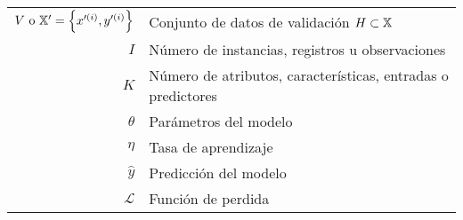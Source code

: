 \begin{table}[H]
\begin{center}
\begin{tabularx}{\textwidth}{|r|X|}
            ${V~\text{o}~\mathbb{{X}}^{\prime} = \left\{x^{\prime(i)}, y^{\prime(i)}\right\}}$ & Conjunto de datos de validación ${H \subset \mathbb{{X}}}$                                                                                                           \\
            $ I $                                                                                 & Número de instancias, registros u observaciones                                                                                                                         \\
            $ K $                                                                                 & Número de atributos, características, entradas o predictores                                                                                                            \\
            $ \theta $                                                                            & Parámetros del modelo                                                                                                                                                   \\
            $ \eta $                                                                              & Tasa de aprendizaje                                                                                                                                                     \\
            $ \hat{y} $                                                                           & Predicción del modelo                                                                                                                                                   \\
            $ \mathcal{L} $                                                                       & Función de perdida                                                                                                                                                      \\

\end{tabularx}
\end{center}
\end{table}
